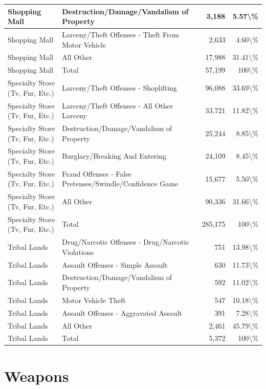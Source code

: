 \documentclass[
]{krantz}
\begin{document}
\begin{longtable}[t]{l|l|r|r}
\hline
Shopping Mall & Destruction/Damage/Vandalism of Property & 3,188 & 5.57\textbackslash{}\%\\
\hline
Shopping Mall & Larceny/Theft Offenses - Theft From Motor Vehicle & 2,633 & 4.60\textbackslash{}\%\\
\hline
Shopping Mall & All Other & 17,988 & 31.41\textbackslash{}\%\\
\hline
Shopping Mall & Total & 57,199 & 100\textbackslash{}\%\\
\hline
Specialty Store (Tv, Fur, Etc.) & Larceny/Theft Offenses - Shoplifting & 96,088 & 33.69\textbackslash{}\%\\
\hline
Specialty Store (Tv, Fur, Etc.) & Larceny/Theft Offenses - All Other Larceny & 33,721 & 11.82\textbackslash{}\%\\
\hline
Specialty Store (Tv, Fur, Etc.) & Destruction/Damage/Vandalism of Property & 25,244 & 8.85\textbackslash{}\%\\
\hline
Specialty Store (Tv, Fur, Etc.) & Burglary/Breaking And Entering & 24,109 & 8.45\textbackslash{}\%\\
\hline
Specialty Store (Tv, Fur, Etc.) & Fraud Offenses - False Pretenses/Swindle/Confidence Game & 15,677 & 5.50\textbackslash{}\%\\
\hline
Specialty Store (Tv, Fur, Etc.) & All Other & 90,336 & 31.66\textbackslash{}\%\\
\hline
Specialty Store (Tv, Fur, Etc.) & Total & 285,175 & 100\textbackslash{}\%\\
\hline
Tribal Lands & Drug/Narcotic Offenses - Drug/Narcotic Violations & 751 & 13.98\textbackslash{}\%\\
\hline
Tribal Lands & Assault Offenses - Simple Assault & 630 & 11.73\textbackslash{}\%\\
\hline
Tribal Lands & Destruction/Damage/Vandalism of Property & 592 & 11.02\textbackslash{}\%\\
\hline
Tribal Lands & Motor Vehicle Theft & 547 & 10.18\textbackslash{}\%\\
\hline
Tribal Lands & Assault Offenses - Aggravated Assault & 391 & 7.28\textbackslash{}\%\\
\hline
Tribal Lands & All Other & 2,461 & 45.79\textbackslash{}\%\\
\hline
Tribal Lands & Total & 5,372 & 100\textbackslash{}\%\\
\hline
\end{longtable}

\section{Weapons}\label{offenseWeapons}
\end{document}
